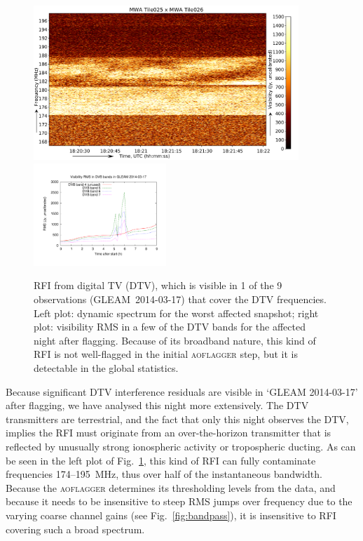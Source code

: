 \documentclass{pasa}
\begin{document}
\noindent\begin{figure}%
\begin{center}\hspace*{-0.2cm}\includegraphics[width=10cm]{img/dvb_example}\includegraphics[width=5cm]{img/2014-03-17-dvb-stddevs}
\end{center}
\caption{RFI from digital TV (DTV), which is visible in 1 of the 9 observations (GLEAM~2014-03-17) that cover the DTV frequencies. Left plot: dynamic spectrum for the worst affected snapshot; right plot: visibility RMS in a few of the DTV bands for the affected night after flagging. Because of its broadband nature, this kind of RFI is not well-flagged in the initial \textsc{aoflagger} step, but it is detectable in the global statistics. }
\label{fig:dvb}
\end{figure}

Because significant DTV interference residuals are visible in `GLEAM 2014-03-17' after flagging, we have analysed this night more extensively. The DTV transmitters are terrestrial, and the fact that only this night observes the DTV, implies the RFI must originate from an over-the-horizon transmitter that is reflected by unusually strong ionospheric activity or tropospheric ducting. As can be seen in the left plot of Fig.~\ref{fig:dvb}, this kind of RFI can fully contaminate frequencies 174--195~MHz, thus over half of the instantaneous bandwidth. Because the \textsc{aoflagger} determines its thresholding levels from the data, and because it needs to be insensitive to steep RMS jumps over frequency due to the varying coarse channel gains (see Fig.~\ref{fig:bandpass}), it is insensitive to RFI covering such a broad spectrum.
\end{document}
